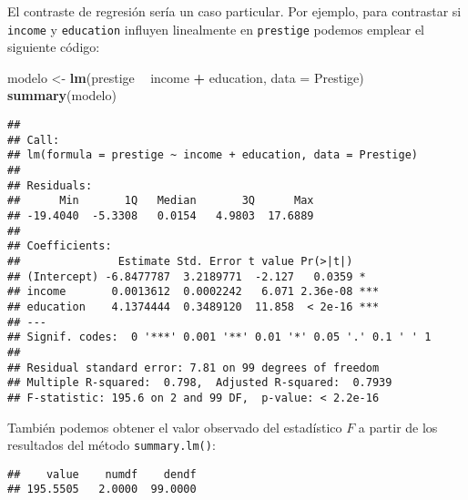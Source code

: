 \documentclass[]{book}
\newenvironment{Shaded}{\begin{snugshade}}{\end{snugshade}}
\newcommand{\KeywordTok}[1]{\textcolor[rgb]{0.13,0.29,0.53}{\textbf{#1}}}
\newcommand{\DataTypeTok}[1]{\textcolor[rgb]{0.13,0.29,0.53}{#1}}
\newcommand{\DecValTok}[1]{\textcolor[rgb]{0.00,0.00,0.81}{#1}}
\newcommand{\StringTok}[1]{\textcolor[rgb]{0.31,0.60,0.02}{#1}}
\newcommand{\CommentTok}[1]{\textcolor[rgb]{0.56,0.35,0.01}{\textit{#1}}}
\newcommand{\OperatorTok}[1]{\textcolor[rgb]{0.81,0.36,0.00}{\textbf{#1}}}
\newcommand{\NormalTok}[1]{#1}
\theoremstyle{break}
\theoremstyle{definition}
\theoremstyle{definition}
\theoremstyle{definition}
\theoremstyle{remark}
\begin{document}
El contraste de regresión sería un caso particular. Por ejemplo, para
contrastar si \texttt{income} y \texttt{education} influyen linealmente
en \texttt{prestige} podemos emplear el siguiente código:

\begin{Shaded}
\begin{Highlighting}[]
\NormalTok{modelo <-}\StringTok{ }\KeywordTok{lm}\NormalTok{(prestige }\OperatorTok{~}\StringTok{ }\NormalTok{income }\OperatorTok{+}\StringTok{ }\NormalTok{education, }\DataTypeTok{data =}\NormalTok{ Prestige)}
\KeywordTok{summary}\NormalTok{(modelo)}
\end{Highlighting}
\end{Shaded}

\begin{verbatim}
## 
## Call:
## lm(formula = prestige ~ income + education, data = Prestige)
## 
## Residuals:
##      Min       1Q   Median       3Q      Max 
## -19.4040  -5.3308   0.0154   4.9803  17.6889 
## 
## Coefficients:
##               Estimate Std. Error t value Pr(>|t|)    
## (Intercept) -6.8477787  3.2189771  -2.127   0.0359 *  
## income       0.0013612  0.0002242   6.071 2.36e-08 ***
## education    4.1374444  0.3489120  11.858  < 2e-16 ***
## ---
## Signif. codes:  0 '***' 0.001 '**' 0.01 '*' 0.05 '.' 0.1 ' ' 1
## 
## Residual standard error: 7.81 on 99 degrees of freedom
## Multiple R-squared:  0.798,  Adjusted R-squared:  0.7939 
## F-statistic: 195.6 on 2 and 99 DF,  p-value: < 2.2e-16
\end{verbatim}

También podemos obtener el valor observado del estadístico \(F\) a
partir de los resultados del método \texttt{summary.lm()}:

\begin{Shaded}
\end{Shaded}

\begin{verbatim}
##    value    numdf    dendf 
## 195.5505   2.0000  99.0000
\end{verbatim}
\end{document}
